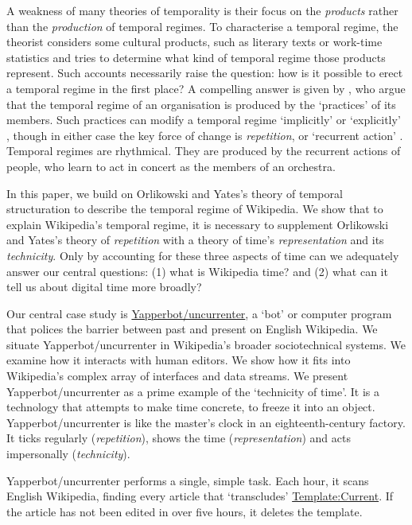 \documentclass[
  Crown,
  times,
  sageh]{sagej}
\begin{document}
A weakness of many theories of temporality is their focus on the
\emph{products} rather than the \emph{production} of temporal regimes.
To characterise a temporal regime, the theorist considers some cultural
products, such as literary texts
\citep{gumbrecht_our_2014, hartog_regimes_2017} or work-time statistics
\citep{castells_rise_2010} and tries to determine what kind of temporal
regime those products represent. Such accounts necessarily raise the
question: how is it possible to erect a temporal regime in the first
place? A compelling answer is given by \citet{orlikowski_its_2002}, who
argue that the temporal regime of an organisation is produced by the
`practices' of its members. Such practices can modify a temporal regime
`implicitly' or `explicitly' \citeyearpar[687]{orlikowski_its_2002},
though in either case the key force of change is \emph{repetition}, or
`recurrent action' \citeyearpar[696]{orlikowski_its_2002}. Temporal
regimes are rhythmical. They are produced by the recurrent actions of
people, who learn to act in concert as the members of an orchestra.

In this paper, we build on Orlikowski and Yates's theory of temporal
structuration to describe the temporal regime of Wikipedia. We show that
to explain Wikipedia's temporal regime, it is necessary to supplement
Orlikowski and Yates's theory of \emph{repetition} with a theory of
time's \emph{representation} and its \emph{technicity}. Only by
accounting for these three aspects of time can we adequately answer our
central questions: (1) what is Wikipedia time? and (2) what can it tell
us about digital time more broadly?

Our central case study is
\href{https://en.wikipedia.org/wiki/User:Yapperbot}{Yapperbot/uncurrenter},
a `bot' or computer program that polices the barrier between past and
present on English Wikipedia. We situate Yapperbot/uncurrenter in
Wikipedia's broader sociotechnical systems. We examine how it interacts
with human editors. We show how it fits into Wikipedia's complex array
of interfaces and data streams. We present Yapperbot/uncurrenter as a
prime example of the `technicity of time'. It is a technology that
attempts to make time concrete, to freeze it into an object.
Yapperbot/uncurrenter is like the master's clock in an
eighteenth-century factory. It ticks regularly (\emph{repetition}),
shows the time (\emph{representation}) and acts impersonally
(\emph{technicity}).

Yapperbot/uncurrenter performs a single, simple task. Each hour, it
scans English Wikipedia, finding every article that `transcludes'
\href{https://en.wikipedia.org/wiki/Template:Current}{Template:Current}.
If the article has not been edited in over five hours, it deletes the
template.
\end{document}
